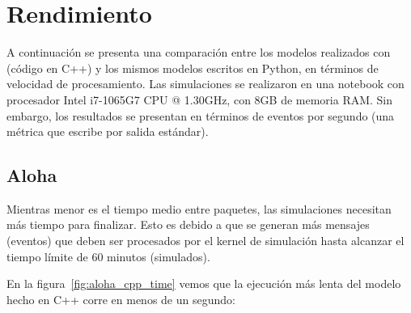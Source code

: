 \section{Rendimiento}

A continuación se presenta una comparación entre los modelos realizados con
\omnetpp{} (código en C++) y los mismos modelos escritos en Python, en términos de
velocidad de procesamiento. Las simulaciones se realizaron en una notebook con
procesador Intel i7-1065G7 CPU @ 1.30GHz, con 8GB de memoria RAM. Sin embargo,
los resultados se presentan en términos de eventos por segundo (una métrica que
\omnetpp{} escribe por salida estándar).

\subsection{Aloha}

Mientras menor es el tiempo medio entre paquetes, las simulaciones necesitan
más tiempo para finalizar. Esto es debido a que se generan más mensajes
(eventos) que deben ser procesados por el kernel de simulación hasta alcanzar
el tiempo límite de 60 minutos (simulados).

En la figura~\ref{fig:aloha_cpp_time} vemos que la ejecución más lenta del
modelo hecho en C++ corre en menos de un segundo:

